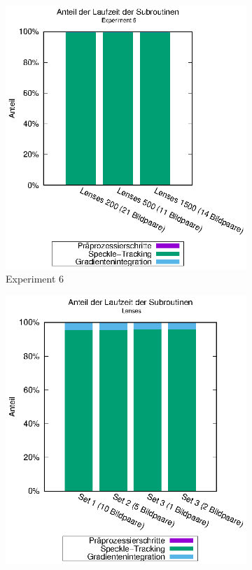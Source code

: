 \begin{center}
	\begin{figure}[htbp]
		\begin{subfigure}[b]{0.5\textwidth}
			\centering
			\includegraphics[width=\textwidth]{pdf/main_exp6}
			\caption{Experiment 6}
			\label{fig:perc_main_exp6}
		\end{subfigure}
		\begin{subfigure}[b]{0.5\textwidth}
			\centering
			\includegraphics[width=\textwidth]{pdf/main_lenses}

\end{subfigure}
\end{figure}
\end{center}
